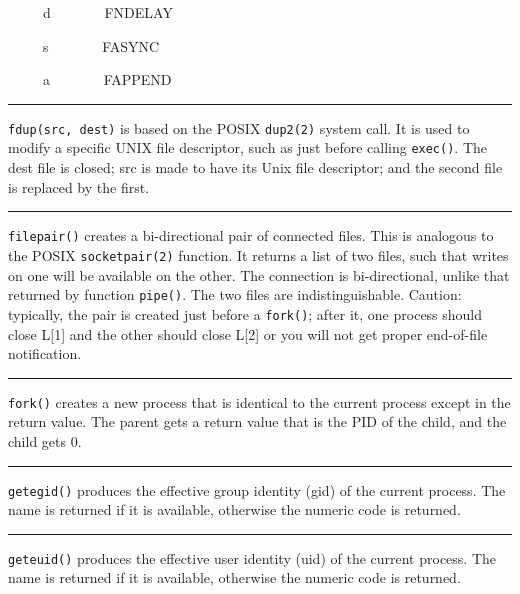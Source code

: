 \ \ \ \ \ d \ \ \ \ \ \ \ FNDELAY 

\ \ \ \ \ s \ \ \ \ \ \ \ FASYNC 

\ \ \ \ \ a \ \ \ \ \ \ \ FAPPEND 

\bigskip\hrule\vspace{0.1cm}

\noindent
\texttt{fdup(src, dest)} is based on the POSIX \texttt{dup2(2)} system
call. It is used to
modify a specific UNIX file descriptor, such as just before calling
\texttt{exec()}. The dest file is closed; src is made to have its Unix file
descriptor; and the second file is replaced by the first. 

\bigskip\hrule\vspace{0.1cm}

\noindent
\texttt{filepair()} creates a bi-directional pair of connected files. This is
analogous to the POSIX \texttt{socketpair(2)} function. It returns a list of two
files, such that writes on one will be available on the other. The
connection is bi-directional, unlike that returned by function \texttt{pipe()}.
The two files are indistinguishable. Caution: typically, the pair is
created just before a \texttt{fork()}; after it, one process should close L[1]
and the other should close L[2] or you will not get proper end-of-file
notification. 

\bigskip\hrule\vspace{0.1cm}

\noindent
\texttt{fork()} creates a new process that is identical to the current process
except in the return value. The parent gets a return value that is the
PID of the child, and the child gets 0.

\bigskip\hrule\vspace{0.1cm}

\noindent
\texttt{getegid()} produces the effective group identity (gid) of the current
process. The name is returned if it is available, otherwise the numeric
code is returned.

\bigskip\hrule\vspace{0.1cm}

\noindent
\texttt{geteuid()} produces the effective user identity (uid) of the current
process. The name is returned if it is available, otherwise the numeric
code is returned.

